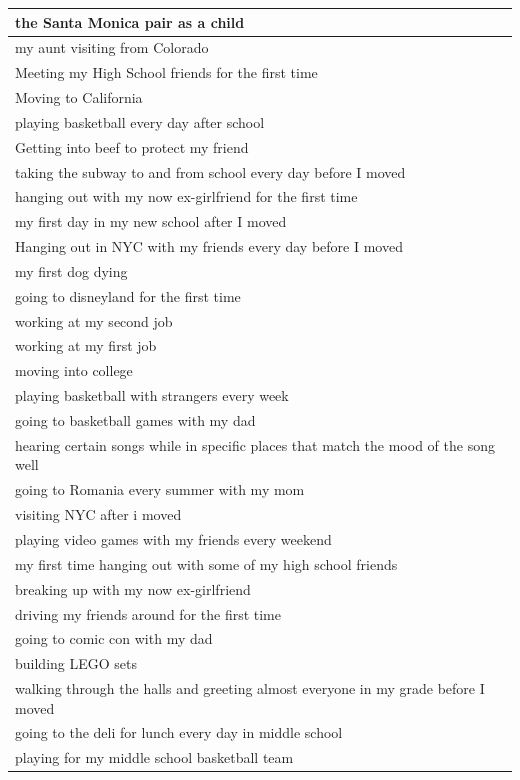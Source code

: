 \documentclass[
  .7em,
  letterpaper,
  DIV=11,
  numbers=noendperiod]{scrartcl}
\begin{document}
\begin{table}
\begin{tabular}{l}
\hline
the Santa Monica pair as a child\\
\hline
my aunt visiting from Colorado\\
\hline
Meeting my High School friends for the first time\\
\hline
Moving to California\\
\hline
playing basketball every day after school\\
\hline
Getting into beef to protect my friend\\
\hline
taking the subway to and from school every day before I moved\\
\hline
hanging out with my now ex-girlfriend for the first time\\
\hline
my first day in my new school after I moved\\
\hline
Hanging out in NYC with my friends every day before I moved\\
\hline
my first dog dying\\
\hline
going to disneyland for the first time\\
\hline
working at my second job\\
\hline
working at my first job\\
\hline
moving into college\\
\hline
playing basketball with strangers every week\\
\hline
going to basketball games with my dad\\
\hline
hearing certain songs while in specific places that match the mood of the song well\\
\hline
going to Romania every summer with my mom\\
\hline
visiting NYC after i moved\\
\hline
playing video games with my friends every weekend\\
\hline
my first time hanging out with some of my high school friends\\
\hline
breaking up with my now ex-girlfriend\\
\hline
driving my friends around for the first time\\
\hline
going to comic con with my dad\\
\hline
building LEGO sets\\
\hline
walking through the halls and greeting almost everyone in my grade before I moved\\
\hline
going to the deli for lunch every day in middle school\\
\hline
playing for my middle school basketball team\\

\end{tabular}
\end{table}
\end{document}
